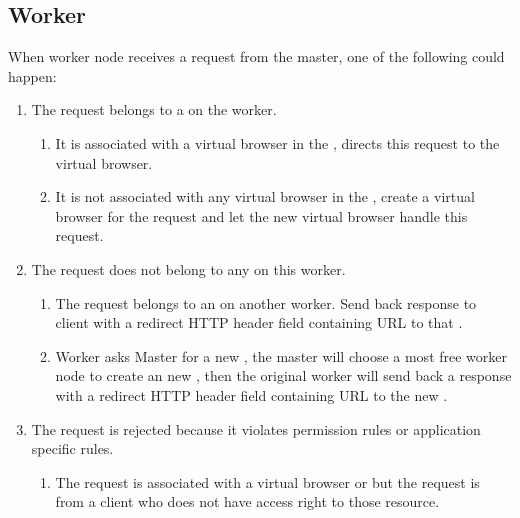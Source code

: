 \subsection{Worker}
\label{sec:worker}
When worker node receives a request from the master,
one of the following could happen:

\begin{enumerate}
    \item The request belongs to a \appins{} on the worker.
    \begin{enumerate}
        \item It is associated with a virtual browser in the \appins{}, directs this request to the virtual browser.
        \item It is not associated with any virtual browser in the \appins{}, create a virtual browser for the request
        and let the new virtual browser handle this request.
    \end{enumerate}

    \item The request does not belong to any \appins{} on this worker.
    \begin{enumerate}
        \item The request belongs to an \appins{} on another worker.
        Send back response to client with a redirect HTTP header field
        containing URL to that \appins{}.
        \item Worker asks Master for a new \appins{},
        the master will choose a most free worker node to create an new \appins{},
        then the original worker will send back a response with a redirect HTTP header field
        containing URL to the new \appins{}.
    \end{enumerate}

    \item The request is rejected because it violates permission rules or application specific rules.
    \begin{enumerate}
        \item The request is associated with a virtual browser or \appins{} but
        the request is from a client who does not have access right to those resource.
    \end{enumerate}
\end{enumerate}


